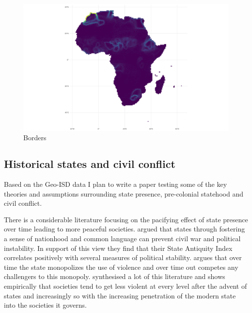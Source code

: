 \documentclass[12pt]{article}
\begin{document}
\begin{figure}[!htb]
	\includegraphics[width=\textwidth,keepaspectratio]{sp_b_sum.pdf}
	\caption{Borders}
	\label{sp_b}
\end{figure}

\subsection{Historical states and civil conflict}

Based on the Geo-ISD data I plan to write a paper testing some of the key
theories and assumptions surrounding state presence, pre-colonial statehood and
civil conflict.

There is a considerable literature focusing on the pacifying effect of state
presence over time leading to more peaceful societies. \citet{Bockstette2002}
argued that states through fostering a sense of nationhood and common language
can prevent civil war and political instability. In support of this view they
find that their State Antiquity Index correlates positively with several
measures of political stability. \citet{Tilly1990} argues that over time the
state monopolizes the use of violence and over time out competes any challengers
to this monopoly. \citet{Pinker2012} synthesised a lot of this literature and
shows empirically that societies tend to get less violent at every level after
the advent of states and increasingly so with the increasing penetration of the
modern state into the societies it governs.
\end{document}
